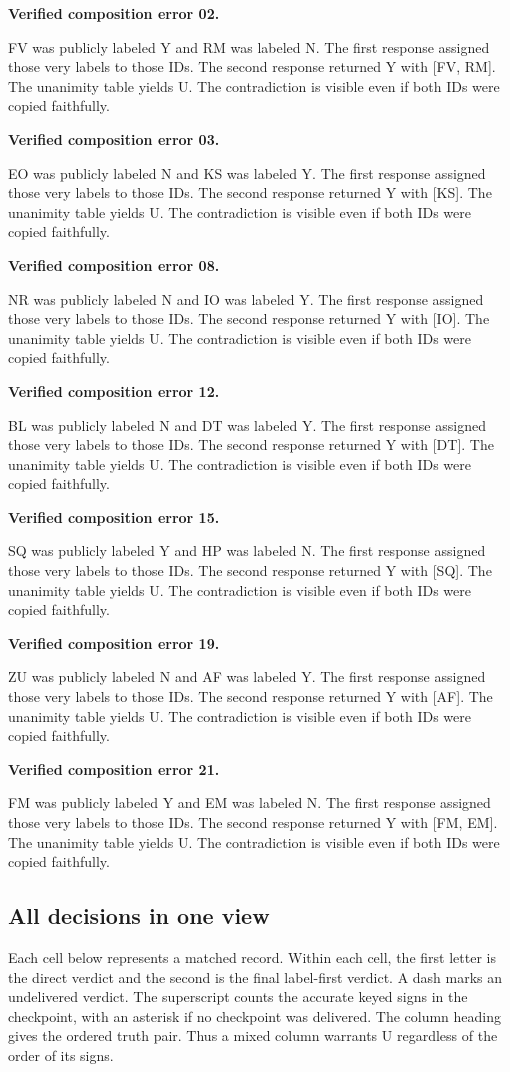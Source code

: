 \documentclass[12pt,letterpaper]{article}
\newcommand{\reading}[2]{\par\smallskip\textsf{\color{accent}\bfseries #1}\enspace #2\par}
\begin{document}
\reading{Verified composition error 02.}{} FV was publicly labeled Y and RM was labeled N. The first response assigned those very labels to those IDs. The second response returned Y with [FV, RM]. The unanimity table yields U. The contradiction is visible even if both IDs were copied faithfully.

\reading{Verified composition error 03.}{} EO was publicly labeled N and KS was labeled Y. The first response assigned those very labels to those IDs. The second response returned Y with [KS]. The unanimity table yields U. The contradiction is visible even if both IDs were copied faithfully.

\reading{Verified composition error 08.}{} NR was publicly labeled N and IO was labeled Y. The first response assigned those very labels to those IDs. The second response returned Y with [IO]. The unanimity table yields U. The contradiction is visible even if both IDs were copied faithfully.

\reading{Verified composition error 12.}{} BL was publicly labeled N and DT was labeled Y. The first response assigned those very labels to those IDs. The second response returned Y with [DT]. The unanimity table yields U. The contradiction is visible even if both IDs were copied faithfully.

\reading{Verified composition error 15.}{} SQ was publicly labeled Y and HP was labeled N. The first response assigned those very labels to those IDs. The second response returned Y with [SQ]. The unanimity table yields U. The contradiction is visible even if both IDs were copied faithfully.

\reading{Verified composition error 19.}{} ZU was publicly labeled N and AF was labeled Y. The first response assigned those very labels to those IDs. The second response returned Y with [AF]. The unanimity table yields U. The contradiction is visible even if both IDs were copied faithfully.

\reading{Verified composition error 21.}{} FM was publicly labeled Y and EM was labeled N. The first response assigned those very labels to those IDs. The second response returned Y with [FM, EM]. The unanimity table yields U. The contradiction is visible even if both IDs were copied faithfully.

\subsection{All decisions in one view}

Each cell below represents a matched record. Within each cell, the first letter is the direct verdict and the second is the final label-first verdict. A dash marks an undelivered verdict. The superscript counts the accurate keyed signs in the checkpoint, with an asterisk if no checkpoint was delivered. The column heading gives the ordered truth pair. Thus a mixed column warrants U regardless of the order of its signs.
\end{document}
